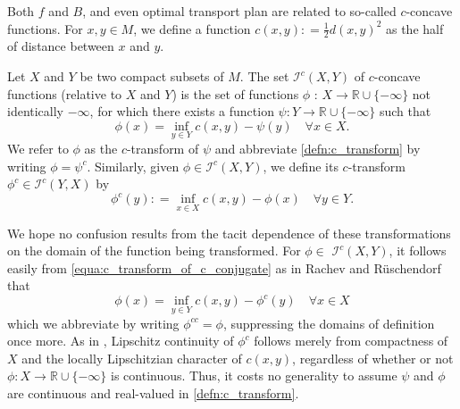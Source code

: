

Both $f$ and $B$, and even optimal transport plan are related to so-called $c$-concave functions.
For $x,y \in M$, we define a function $c(x,y): = \frac{1}{2} d(x,y)^2$ as the half of distance between $x$ and $y$.

\begin{defn} 
	Let \( X \) and \( Y \) be two compact subsets of \( M \).
	The set \( \mathcal{I} ^ { c } ( X , Y ) \) of \( c \)-concave functions (relative to \( X \) and \( Y \)) is
	the set of functions \( \phi \) : \( X \rightarrow \mathbb { R } \cup \{ - \infty \} \) not identically \( - \infty \),
	for which there exists a function \( \psi : Y \rightarrow \mathbb { R } \cup \{ - \infty \} \) such that
	\begin{equation}
		\label{defn:c_transform}
		\phi ( x ) = \inf _ { y \in Y } c ( x , y ) - \psi ( y ) \quad \forall x \in X.
	\end{equation}
	We refer to \( \phi \) as the \( c \)-transform of \( \psi \) and abbreviate \cref{defn:c_transform}
	by writing \( \phi = \psi ^ { c } \).
	Similarly, given \( \phi \in \mathcal{I} ^ { c } ( X , Y ) \),
	we define its \( c \)-transform \( \phi ^ { c } \in \mathcal{I} ^ { c } ( Y , X ) \) by
	\begin{equation}
		\label{equa:c_transform_of_c_conjugate}
		\phi ^ { c } ( y ) : = \inf _ { x \in X } c ( x , y ) - \phi ( x ) \quad \forall y \in Y.
	\end{equation}
\end{defn}

We hope no confusion results from the tacit dependence of
these transformations on the domain of the function being transformed.
For \( \phi \in \) \( \mathcal { I } ^ { c } ( X , Y ) \),
it follows easily from \cref{equa:c_transform_of_c_conjugate} as in Rachev and Rüschendorf
\cite[Section 3.3]{Rachev1998} that
\[ \phi ( x ) = \inf _ { y \in Y } c ( x , y ) - \phi ^ { c } ( y ) \quad \forall x \in X \]
which we abbreviate by writing \( \phi ^ { c c } = \phi \), suppressing the domains of definition once more.
As in \cite{mccann2001polar}, Lipschitz continuity of \( \phi ^ { c } \) follows merely from
compactness of \( X \) and the locally Lipschitzian character of \( c ( x , y ) \),
regardless of whether or not \( \phi : X \rightarrow \mathbb { R } \cup \{ - \infty \} \) is continuous.
Thus, it costs no generality to
assume \( \psi \) and \( \phi \) are continuous and real-valued in \cref{defn:c_transform}.


